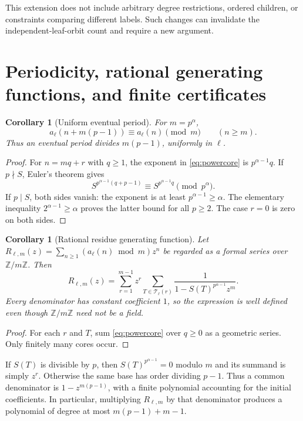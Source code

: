 \documentclass[11pt,letterpaper]{article}
\newtheorem{corollary}[theorem]{Corollary}
\theoremstyle{definition}
\theoremstyle{remark}
\newcommand{\Z}{\mathbb Z}
\newcommand{\T}{\mathcal T}
\begin{document}
This extension does not include arbitrary degree restrictions, ordered
children, or constraints comparing different labels. Such changes can
invalidate the independent-leaf-orbit count and require a new argument.

\section{Periodicity, rational generating functions, and finite certificates}
\label{sec:periods}
\begin{corollary}[Uniform eventual period]\label{cor:period}
For $m=p^\alpha$,
\begin{equation}\label{eq:period}
 a_\ell(n+m(p-1))\equiv a_\ell(n)\pmod m
 \qquad(n\ge m).
\end{equation}
Thus an eventual period divides $m(p-1)$, uniformly in $\ell$.
\end{corollary}
\begin{proof}
For $n=mq+r$ with $q\ge1$, the exponent in \eqref{eq:powercore} is
$p^{\alpha-1}q$. If $p\nmid S$, Euler's theorem gives
\[
 S^{p^{\alpha-1}(q+p-1)}\equiv
 S^{p^{\alpha-1}q}\pmod{p^\alpha}.
\]
If $p\mid S$, both sides vanish: the exponent is at least
$p^{\alpha-1}\ge\alpha$. The elementary inequality
$2^{\alpha-1}\ge\alpha$ proves the latter bound for all $p\ge2$.
The case $r=0$ is zero on both sides.
\end{proof}

\begin{corollary}[Rational residue generating function]\label{cor:gf}
Let
$R_{\ell,m}(z)=\sum_{n\ge1}(a_\ell(n)\bmod m)z^n$
be regarded as a formal series over $\Z/m\Z$. Then
\begin{equation}\label{eq:coregf}
 R_{\ell,m}(z)=
 \sum_{r=1}^{m-1}z^r
 \sum_{T\in\T_\ell(r)}
 \frac{1}{1-S(T)^{p^{\alpha-1}}z^m}.
\end{equation}
Every denominator has constant coefficient $1$, so the expression is
well defined even though $\Z/m\Z$ need not be a field.
\end{corollary}
\begin{proof}
For each $r$ and $T$, sum \eqref{eq:powercore} over $q\ge0$ as a
geometric series. Only finitely many cores occur.
\end{proof}

If $S(T)$ is divisible by $p$, then $S(T)^{p^{\alpha-1}}=0$ modulo $m$
and its summand is simply $z^r$. Otherwise the same base has order
dividing $p-1$. Thus a common denominator is
$1-z^{m(p-1)}$, with a finite polynomial accounting for the initial
coefficients. In particular, multiplying $R_{\ell,m}$ by that denominator
produces a polynomial of degree at most $m(p-1)+m-1$.
\end{document}
